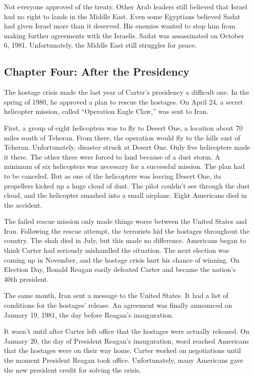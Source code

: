 \documentclass{article}
\begin{document}
Not everyone approved of the treaty. Other Arab leaders still believed that Israel had no right to lands in the Middle East. Even some Egyptians believed Sadat had given Israel more than it deserved. His enemies wanted to stop him from making further agreements with the Israelis. Sadat was assassinated on October 6, 1981. Unfortunately, the Middle East still struggles for peace. 


\subsection*{Chapter Four: After the Presidency}

The hostage crisis made the last year of Carter's presidency a difficult one. In the spring of 1980, he approved a plan to rescue the hostages. On April 24, a secret helicopter mission, called ``Operation Eagle Claw,'' was sent to Iran. 

First, a group of eight helicopters was to fly to Desert One, a location about 70 miles south of Teheran. From there, the operation would fly to the hills east of Teheran. Unfortunately, disaster struck at Desert One. Only five helicopters made it there. The other three were forced to land because of a dust storm. A minimum of six helicopters was necessary for a successful mission. The plan had to be canceled. But as one of the helicopters was leaving Desert One, its propellers kicked up a huge cloud of dust. The pilot couldn't see through the dust cloud, and the helicopter smashed into a small airplane. Eight Americans died in the accident.

The failed rescue mission only made things worse between the United States and Iran. Following the rescue attempt, the terrorists hid the hostages throughout the country. The shah died in July, but this made no difference. Americans began to think Carter had seriously mishandled the situation. The next election was coming up in November, and the hostage crisis hurt his chance of winning. On Election Day, Ronald Reagan easily defeated Carter and became the nation's 40th president.

The same month, Iran sent a message to the United States. It had a list of conditions for the hostages' release. An agreement was finally announced on January 19, 1981, the day before Reagan's inauguration.

It wasn't until after Carter left office that the hostages were actually released. On January 20, the day of President Reagan's inauguration, word reached Americans that the hostages were on their way home. Carter worked on negotiations until the moment President Reagan took office. Unfortunately, many Americans gave the new president credit for solving the crisis.
\end{document}
